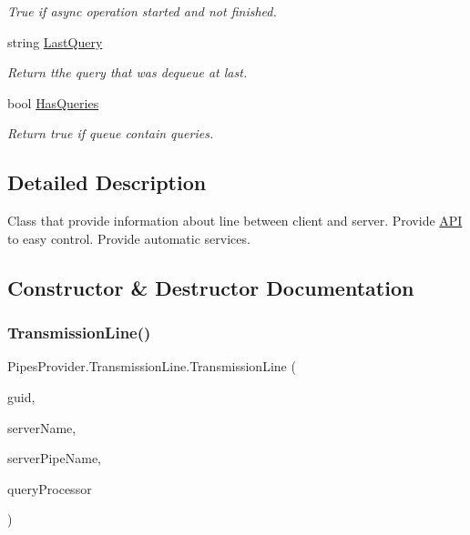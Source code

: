 \begin{DoxyCompactItemize}
\begin{DoxyCompactList}\small\item\em True if async operation started and not finished. \end{DoxyCompactList}\item 
string \mbox{\hyperlink{class_pipes_provider_1_1_transmission_line_ae74210ed172643f6e9bd23bc7913f9b1}{Last\+Query}}
\begin{DoxyCompactList}\small\item\em Return tthe query that was dequeue at last. \end{DoxyCompactList}\item 
bool \mbox{\hyperlink{class_pipes_provider_1_1_transmission_line_a39f81c072ca65efd260d02fc7d5c5458}{Has\+Queries}}
\begin{DoxyCompactList}\small\item\em Return true if queue contain queries. \end{DoxyCompactList}\end{DoxyCompactItemize}


\subsection{Detailed Description}
Class that provide information about line between client and server. Provide \mbox{\hyperlink{class_pipes_provider_1_1_a_p_i}{A\+PI}} to easy control. Provide automatic services. 



\subsection{Constructor \& Destructor Documentation}
\mbox{\label{class_pipes_provider_1_1_transmission_line_a20398f48516f0fc5fe0700b01b7fc6d7}} 
\subsubsection{\texorpdfstring{Transmission\+Line()}{TransmissionLine()}}
{\footnotesize\ttfamily Pipes\+Provider.\+Transmission\+Line.\+Transmission\+Line (\begin{DoxyParamCaption}\item[{string}]{guid,  }\item[{string}]{server\+Name,  }\item[{string}]{server\+Pipe\+Name,  }\item[{System.\+Action$<$ \mbox{\hyperlink{class_pipes_provider_1_1_transmission_line}{Transmission\+Line}} $>$}]{query\+Processor }\end{DoxyParamCaption})}




